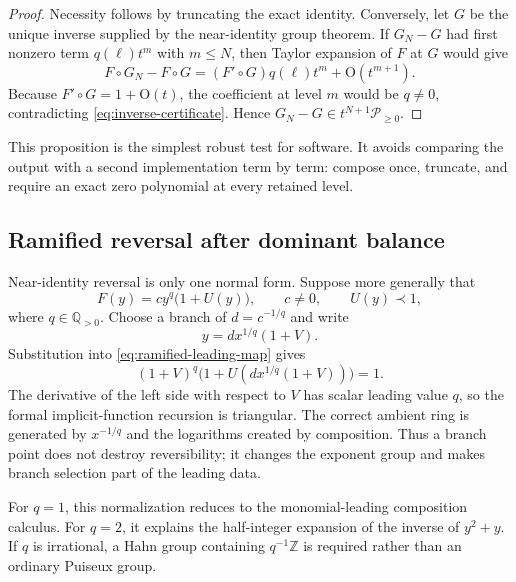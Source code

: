 \documentclass[11pt,oneside]{article}
\numberwithin{equation}{section}
\theoremstyle{definition}
\newcommand{\Q}{\mathbb Q}
\newcommand{\Z}{\mathbb Z}
\newcommand{\PL}{\mathscr P}
\newcommand{\bigO}{\mathrm{O}}
\begin{document}
\begin{proof}
Necessity follows by truncating the exact identity.  Conversely, let \(G\) be
the unique inverse supplied by the near-identity group theorem.  If \(G_N-G\)
had first nonzero term \(q(\ell)t^m\) with \(m\le N\), then Taylor expansion of
\(F\) at \(G\) would give
\[
  F\circ G_N-F\circ G
  =(F'\circ G)q(\ell)t^m+\bigO(t^{m+1}).
\]
Because \(F'\circ G=1+\bigO(t)\), the coefficient at level \(m\) would be
\(q\ne0\), contradicting \eqref{eq:inverse-certificate}.  Hence
\(G_N-G\in t^{N+1}\PL_{\ge0}\).
\end{proof}

This proposition is the simplest robust test for software.  It avoids comparing
the output with a second implementation term by term: compose once, truncate,
and require an exact zero polynomial at every retained level.

\subsection{Ramified reversal after dominant balance}

Near-identity reversal is only one normal form.  Suppose more generally that
\begin{equation}\label{eq:ramified-leading-map}
  F(y)=c y^q\bigl(1+U(y)\bigr),
  \qquad c\ne0,
  \qquad U(y)\prec1,
\end{equation}
where \(q\in\Q_{>0}\).  Choose a branch of
\(d=c^{-1/q}\) and write
\begin{equation}\label{eq:ramified-inverse-ansatz}
  y=d x^{1/q}(1+V).
\end{equation}
Substitution into \eqref{eq:ramified-leading-map} gives
\begin{equation}\label{eq:ramified-normalized-equation}
  (1+V)^q
  \bigl(1+U(d x^{1/q}(1+V))\bigr)=1.
\end{equation}
The derivative of the left side with respect to \(V\) has scalar leading value
\(q\), so the formal implicit-function recursion is triangular.  The correct
ambient ring is generated by \(x^{-1/q}\) and the logarithms created by
composition.  Thus a branch point does not destroy reversibility; it changes
the exponent group and makes branch selection part of the leading data.

For \(q=1\), this normalization reduces to the monomial-leading composition
calculus.  For \(q=2\), it explains the half-integer expansion of the inverse of
\(y^2+y\).  If \(q\) is irrational, a Hahn group containing \(q^{-1}\Z\) is
required rather than an ordinary Puiseux group.
\end{document}
